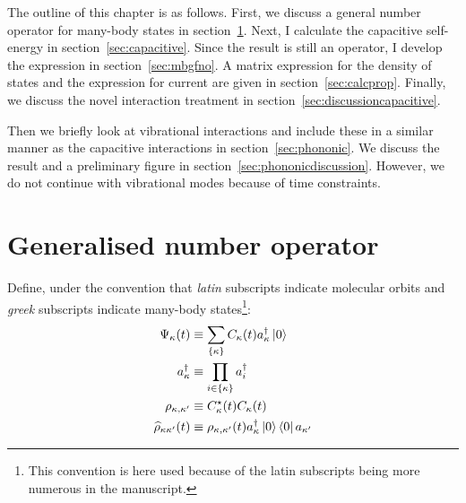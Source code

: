 The outline of this chapter is as follows. First, we discuss a general number operator for many-body states in section~\ref{sec:gno}. Next, I calculate the capacitive self-energy in section~\ref{sec:capacitive}. Since the result is still an operator, I develop the expression in section~\ref{sec:mbgfno}. A matrix expression for the density of states and the expression for current are given in section~\ref{sec:calcprop}. Finally, we discuss the novel interaction treatment in section~\ref{sec:discussioncapacitive}.

Then we briefly look at vibrational interactions and include these in a similar manner as the capacitive interactions in section~\ref{sec:phononic}. We discuss the result and a preliminary figure in section~\ref{sec:phononicdiscussion}. However, we do not continue with vibrational modes because of time constraints.
\section{Generalised number operator}
\label{sec:gno}


Define, under the convention that \emph{latin} subscripts indicate molecular orbits and \emph{greek} subscripts indicate many-body states\footnote{This convention is here used because of the latin subscripts being more numerous in the manuscript.}:
\begin{align*}
\Psi_\kappa (t) &\equiv \sum_{ \left\{\kappa\right\}} C_\kappa(t) a_\kappa^\dagger \ket{0} \\
a^\dagger_\kappa &\equiv \prod_{ i \in \left\{\kappa\right\}} a_i^\dagger \\
\rho_{\kappa,\kappa^\prime} & \equiv C_\kappa^\star (t) C_\kappa (t)
\\
\widehat{\rho}_{\kappa\kappa^\prime}(t) &\equiv \rho_{\kappa,\kappa^\prime} (t) a_{\kappa}^\dagger \ket{0}\bra{0}a_{\kappa^\prime}
\end{align*}

